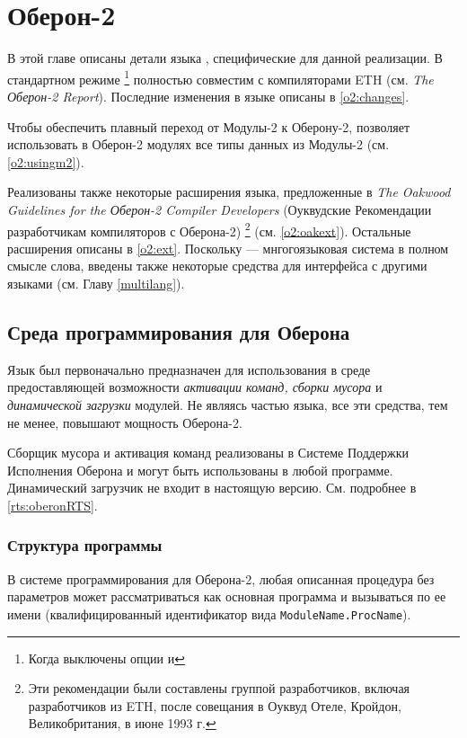 \chapter{\XDS{} Оберон-2}\label{o2}

В этой главе описаны детали языка
\ot{}, специфические для данной реализации. В стандартном режиме
\footnote{Когда выключены опции  и } 
\xds{} \ot{} полностью совместим с компиляторами ETH
(см. {\em The Оберон-2 Report}). 
Последние изменения в языке описаны в %
\ref{o2:changes}.

Чтобы обеспечить плавный переход от Модулы-2 к Оберону-2,
\XDS{} позволяет использовать в Оберон-2 модулях все типы данных
из Модулы-2 (см. \ref{o2:usingm2}).

Реализованы также некоторые расширения языка, предложенные в
{\em The Oakwood Guidelines for the Оберон-2 Compiler Developers}
(Оуквудские Рекомендации разработчикам компиляторов с Оберона-2)
\footnote{Эти рекомендации были составлены группой разработчиков,
включая разработчиков из ETH,
после совещания в Оуквуд Отеле, Кройдон, Великобритания, в июне 1993 г.}
(см. \ref{o2:oakext}). 
Остальные расширения описаны в \ref{o2:ext}. 
Поскольку \xds{} --- мнгогоязыковая система в полном смысле слова,
введены также некоторые средства для интерфейса с другими языками
(см. Главу \ref{multilang}).

\section{Среда программирования для Оберона}\label{o2:env}

Язык \ot{} был первоначально предназначен для использования в среде
предоставляющей возможности
{\em активации команд, сборки мусора}  и 
{\em динамической загрузки} модулей. Не являясь частью языка, все
эти средства, тем не менее, повышают мощность Оберона-2.

Сборщик мусора и активация команд реализованы в 
Системе Поддержки Исполнения Оберона
и могут быть использованы в любой программе. Динамический загрузчик
не входит в настоящую версию. См. подробнее в
\ref{rts:oberonRTS}.

\subsection{Структура программы}\label{o2:env:main}

В системе программирования для Оберона-2, любая описанная 
процедура без параметров может рассматриваться как основная программа
и вызываться по ее имени (квалифицированный идентификатор вида
\verb|ModuleName.ProcName|).

